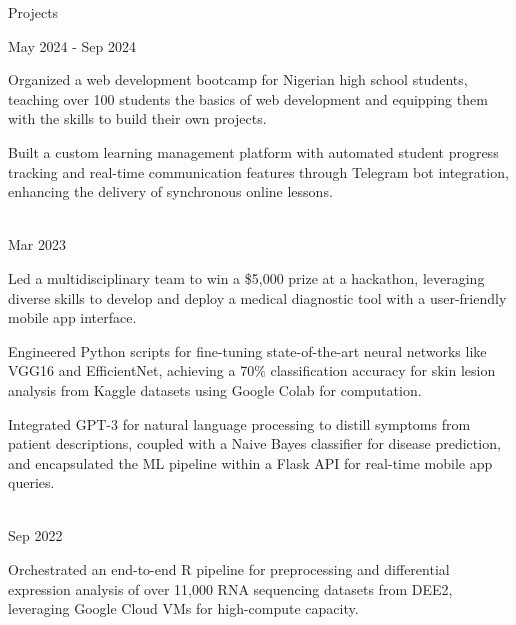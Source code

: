 \documentclass[]{resume-knyte}
\begin{document}
\begin{topic}{Projects}

    {May 2024 - Sep 2024}
    {
        \item Organized a web development bootcamp for Nigerian high school students, teaching over 100 students the basics of web development and equipping them with the skills to build their own projects.
        \vspace{-5pt}
    
        \item Built a custom learning management platform with automated student progress tracking and real-time communication features through Telegram bot integration, enhancing the delivery of synchronous online lessons.
        \vspace{-5pt}
    }\\

    {Mar 2023}
    {
        \item Led a multidisciplinary team to win a \$5,000 prize at a hackathon, leveraging diverse skills to develop and deploy a medical diagnostic tool with a user-friendly mobile app interface.
        \vspace{-5pt}
    
        \item Engineered Python scripts for fine-tuning state-of-the-art neural networks like VGG16 and EfficientNet, achieving a 70\% classification accuracy for skin lesion analysis from Kaggle datasets using Google Colab for computation.
        \vspace{-5pt}
    
        \item Integrated GPT-3 for natural language processing to distill symptoms from patient descriptions, coupled with a Naive Bayes  classifier for disease prediction, and encapsulated the ML pipeline within a Flask API for real-time mobile app queries.
        \vspace{-5pt}
    }\\

    {Sep 2022}
    {
        \item Orchestrated an end-to-end R pipeline for preprocessing and differential expression analysis of over 11,000 RNA sequencing datasets from DEE2, leveraging Google Cloud VMs for high-compute capacity.
        \vspace{-5pt}

}
\end{topic}
\end{document}
